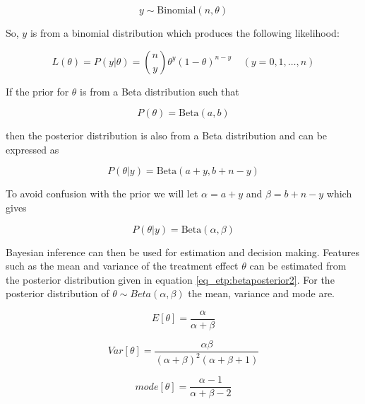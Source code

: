 \begin{equation}
	y \sim \text{Binomial}(n, \theta)
\end{equation}

So, $y$ is from a binomial distribution which produces the following likelihood: 

\begin{equation}
	L(\theta) = P(y|\theta) = {n \choose y}\theta^y (1-\theta)^{n-y} \; \; \; \; (y = 0,1,\ldots,n)
\end{equation}

If the prior for $\theta$ is from a Beta distribution such that 

\begin{equation}
	P(\theta) = \text{Beta}(a,b)
\end{equation}

then the posterior distribution is also from a Beta distribution and can be expressed as 

\begin{equation}
\label{eq_etp:betaposterior}
	P(\theta|y) = \text{Beta}(a+y,b+n-y)
\end{equation}

To avoid confusion with the prior we will let $\alpha = a+y$ and $\beta = b+n-y$ which gives

\begin{equation}
	\label{eq_etp:betaposterior2}
	P(\theta|y) = \text{Beta}(\alpha,\beta)
\end{equation}

Bayesian inference can then be used for estimation and decision making. Features such as the mean and  variance of the treatment effect $\theta$ can be  estimated from the posterior distribution given in equation \ref{eq_etp:betaposterior2}. For the posterior distribution of $\theta \sim Beta(\alpha,\beta)$ the mean, variance and mode are.

\begin{equation}
\label{eq_etp:betamean}
	E[\theta] = \frac{\alpha}{\alpha + \beta} 
\end{equation}

\begin{equation}
\label{eq_etp:betavar}
	Var[\theta] = \frac{\alpha\beta}{(\alpha+\beta)^2 (\alpha+\beta+1)}
\end{equation}

\begin{equation}
	\label{eq_etp:betamode}
	mode[\theta] = \frac{\alpha - 1 }{\alpha + \beta - 2} 
\end{equation}
 
